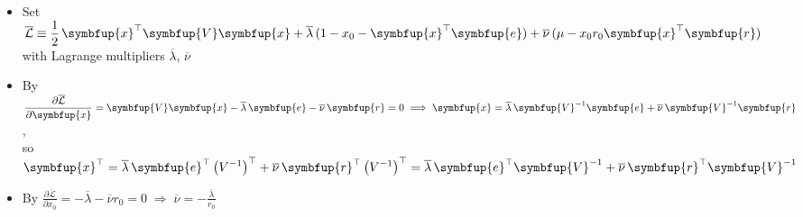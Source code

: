 \documentclass[11pt]{extarticle}
\newcommand{\ds}{\displaystyle}
\newcommand{\ie}{\;\Longrightarrow\;}
\newcommand{\vx}{\symbfup{x}}
\newcommand{\vV}{\symbfup{V}}
\newcommand{\ve}{\symbfup{e}}
\newcommand{\vr}{\symbfup{r}}
\theoremstyle{definition}
\begin{document}
\begin{itemize}\setlength\itemsep{0em}
  \item Set $\ds\overline{\mathcal{L}}\equiv\frac{1}{2}\,\vx^\top\vV\vx + \overline{\lambda}\,(1 - x_0 - \vx^\top\ve) + \overline{\nu}\,(\mu - x_0 r_0 \vx^\top\vr)$ with Lagrange multipliers $\overline{\lambda}$, $\overline{\nu}$
  \item By $\ds\frac{\partial\overline{\mathcal{L}}}{\partial\vx} = \vV\vx - \overline{\lambda}\,\ve - \overline{\nu}\,\vr = 0\ie\vx = \overline{\lambda}\,\vV^{-1}\ve + \overline{\nu}\,\vV^{-1}\vr$, \\ so $\ds\vx^\top = \overline{\lambda}\,\ve^\top\left(V^{-1}\right)^\top + \overline{\nu}\,\vr^\top\left(V^{-1}\right)^\top = \overline{\lambda}\,\ve^\top\vV^{-1} + \overline{\nu}\,\vr^\top\vV^{-1}$
  \item By $\ds\frac{\partial\overline{\mathcal{L}}}{\partial x_0} = -\overline{\lambda} - \overline{\nu}r_0 = 0\ie\overline{\nu} = -\frac{\overline{\lambda}}{r_0}$
\end{itemize}

\newpage
\end{document}
